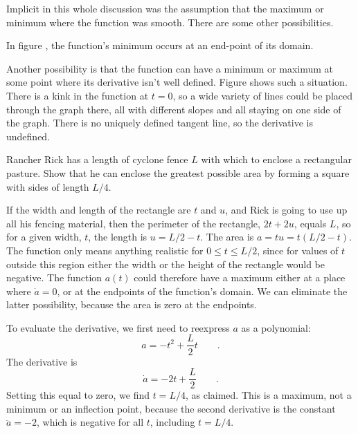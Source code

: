 Implicit in this whole discussion was the assumption that the maximum or minimum where the function was
smooth. There are some other possibilities.

In figure , the function's minimum occurs at an end-point of its domain.
%
%

Another possibility is that the function can have a minimum or maximum at some point where its derivative
isn't well defined. Figure  shows such a situation. There is a kink in the function at $t=0$,
so a wide variety of lines could be placed through the graph there, all with different slopes and all staying
on one side of the graph. There is no uniquely defined tangent line, so the derivative is undefined.

\begin{eg}
\egquestion Rancher Rick has a length of cyclone fence $L$ with which to enclose a rectangular pasture.
Show that he can enclose the greatest possible area by forming a square with sides of length $L/4$.

\eganswer If the width and length of the rectangle are $t$ and $u$, and Rick is going to use up
all his fencing material, then the perimeter of the rectangle, $2t+2u$, equals $L$, so for a given
width, $t$, the length is $u=L/2-t$. The area is $a=tu=t(L/2-t)$. The function only means anything realistic
for $0\le t\le L/2$, since for values of $t$ outside this region either the width or the height of the
rectangle would be negative. The function $a(t)$ could therefore have a maximum either at a place
where $\dot{a}=0$, or at the endpoints of the function's domain. We can eliminate the latter possibility,
because the area is zero at the endpoints.

To evaluate the derivative, we first need to reexpress $a$ as a polynomial:
\begin{equation*}
  a=-t^2+\frac{L}{2}t \qquad .
\end{equation*}
The derivative is
\begin{equation*}
  \dot{a}=-2t+\frac{L}{2} \qquad .
\end{equation*}
Setting this equal to zero, we find $t=L/4$, as claimed. This is a maximum, not a minimum or an
inflection point, because the second derivative is the constant $\ddot{a}=-2$, which is negative
for all $t$, including $t=L/4$.
\end{eg}

